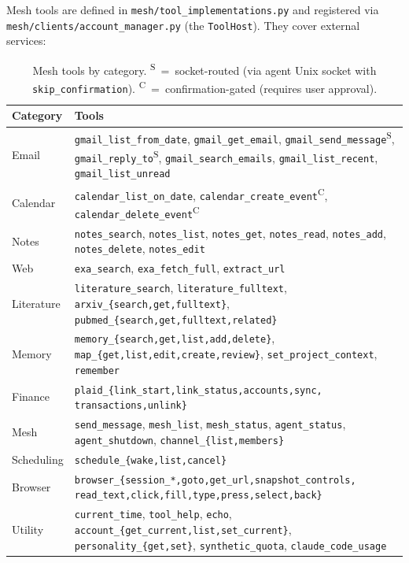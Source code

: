 \documentclass[11pt,letterpaper]{report}
\newcommand{\code}[1]{\texttt{#1}}
\begin{document}
Mesh tools are defined in \code{mesh/tool\_implementations.py} and
registered via \code{mesh/clients/account\_manager.py} (the
\code{ToolHost}). They cover external services:

\begin{table}[h]
\centering
\small
\begin{tabular}{@{}lL{8cm}@{}}
\toprule
\textbf{Category} & \textbf{Tools} \\
\midrule
Email      & \code{gmail\_list\_from\_date}, \code{gmail\_get\_email},
             \code{gmail\_send\_message}\textsuperscript{S},
             \code{gmail\_reply\_to}\textsuperscript{S},
             \code{gmail\_search\_emails},
             \code{gmail\_list\_recent},
             \code{gmail\_list\_unread} \\
Calendar   & \code{calendar\_list\_on\_date},
             \code{calendar\_create\_event}\textsuperscript{C},
             \code{calendar\_delete\_event}\textsuperscript{C} \\
Notes      & \code{notes\_search}, \code{notes\_list}, \code{notes\_get},
             \code{notes\_read}, \code{notes\_add}, \code{notes\_delete},
             \code{notes\_edit} \\
Web        & \code{exa\_search}, \code{exa\_fetch\_full},
             \code{extract\_url} \\
Literature & \code{literature\_search}, \code{literature\_fulltext},
             \code{arxiv\_\{search,get,fulltext\}},
             \code{pubmed\_\{search,get,fulltext,related\}} \\
Memory     & \code{memory\_\{search,get,list,add,delete\}},
             \code{map\_\{get,list,edit,create,review\}},
             \code{set\_project\_context},
             \code{remember} \\
Finance    & \code{plaid\_\{link\_start,link\_status,accounts,sync,
             transactions,unlink\}} \\
Mesh       & \code{send\_message}, \code{mesh\_list}, \code{mesh\_status},
             \code{agent\_status}, \code{agent\_shutdown},
             \code{channel\_\{list,members\}} \\
Scheduling & \code{schedule\_\{wake,list,cancel\}} \\
Browser    & \code{browser\_\{session\_*,goto,get\_url,snapshot\_controls,
             read\_text,click,fill,type,press,select,back\}} \\
Utility    & \code{current\_time}, \code{tool\_help}, \code{echo},
             \code{account\_\{get\_current,list,set\_current\}},
             \code{personality\_\{get,set\}},
             \code{synthetic\_quota}, \code{claude\_code\_usage} \\
\bottomrule
\end{tabular}
\caption{Mesh tools by category.
  \textsuperscript{S}~=~socket-routed (via agent Unix socket with
  \code{skip\_confirmation}).
  \textsuperscript{C}~=~confirmation-gated (requires user approval).}
\label{tab:mesh-tools}
\end{table}
\end{document}
